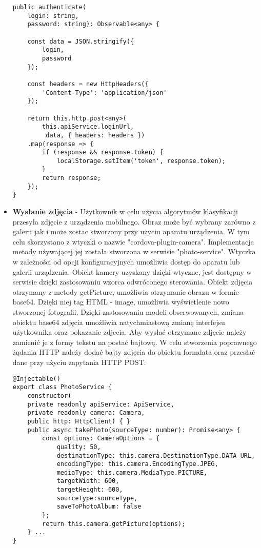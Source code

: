 \begin{itemize}
\begin{lstlisting}[caption=Metoda autoryzacji urządzenia mobilnego.]
public authenticate(
	login: string, 
	password: string): Observable<any> {
	
	const data = JSON.stringify({
		login,
		password
	});
	
	const headers = new HttpHeaders({ 
		'Content-Type': 'application/json' 
	});
	
	return this.http.post<any>(
		this.apiService.loginUrl,
		 data, { headers: headers })
	.map(response => {
		if (response && response.token) {
			localStorage.setItem('token', response.token);
		}
		return response;
	});
}
\end{lstlisting} 


\item \textbf{Wysłanie zdjęcia} - Użytkownik w celu użycia algorytmów klasyfikacji przesyła zdjęcie z urządzenia mobilnego. Obraz może być wybrany zarówno z galerii jak i może zostac stworzony przy użyciu aparatu urządzenia. W tym celu skorzystano z wtyczki o nazwie "cordova-plugin-camera". Implementacja metody używającej jej została stworzona w serwisie "photo-service". Wtyczka w zależności od opcji konfiguracyjnych umożliwia dostęp do aparatu lub galerii urządzenia. Obiekt kamery uzyskany dzięki wtyczne, jest dostępny w serwisie dzięki zastosowaniu wzorca odwróconego sterowania. Obiekt zdjęcia otrzymany z metody getPicture, umożliwia otrzymanie obrazu w formie base64. Dzięki niej tag HTML - image, umożliwia wyświetlenie nowo stworzonej fotografii. Dzięki zastosowaniu modeli obserwowanych, zmiana obiektu base64 zdjęcia umożliwia natychmiastową zmianę interfejsu użytkownika oraz pokazanie zdjecia. Aby wysłać otrzymane zdjęcie należy zamienić je z formy tekstu na postać bajtową. W celu stworzenia poprawnego żądania HTTP należy dodać bajty zdjęcia do obiektu formdata oraz przesłać dane przy użyciu zapytania HTTP POST.



\begin{lstlisting}[caption=Wykorzystanie wtyczki w celu prezentacji zdjecia.]
@Injectable()
export class PhotoService {
	constructor(
	private readonly apiService: ApiService,
	private readonly camera: Camera,
	public http: HttpClient) { }	
	public async takePhoto(sourceType: number): Promise<any> {
		const options: CameraOptions = {
			quality: 50,
			destinationType: this.camera.DestinationType.DATA_URL,
			encodingType: this.camera.EncodingType.JPEG,
			mediaType: this.camera.MediaType.PICTURE,
			targetWidth: 600,
			targetHeight: 600,
			sourceType:sourceType,
			saveToPhotoAlbum: false
		};		
		return this.camera.getPicture(options);
	} ...
}
\end{lstlisting} 


\end{itemize}
